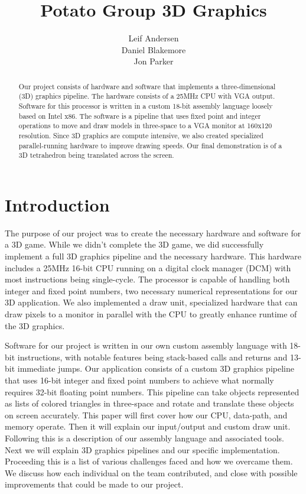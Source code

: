\documentclass[onecolumn]{IEEEtran}
\title{Potato Group 3D Graphics}
\author{Leif Andersen\\Daniel Blakemore\\Jon Parker}
\begin{document}
\maketitle

\begin{abstract}
Our project consists of hardware and software that implements a three-dimensional (3D) graphics pipeline.  The hardware consists of a 25MHz CPU with VGA output.  Software for this processor is written in a custom 18-bit assembly language loosely based on Intel x86.  The software is a pipeline that uses fixed point and integer operations to move and draw models in three-space to a VGA monitor at 160x120 resolution.  Since 3D graphics are compute intensive, we also created specialized parallel-running hardware to improve drawing speeds.  Our final demonstration is of a 3D tetrahedron being translated across the screen.
\end{abstract}

\section{Introduction}
The purpose of our project was to create the necessary hardware and software for a 3D game.  While we didn’t complete the 3D game, we did successfully implement a full 3D graphics pipeline and the necessary hardware.  This hardware includes a 25MHz 16-bit CPU running on a digital clock manager (DCM) with most instructions being single-cycle.  The processor is capable of handling both integer and fixed point numbers, two necessary numerical representations for our 3D application.  We also implemented a draw unit, specialized hardware that can draw pixels to a monitor in parallel with the CPU to greatly enhance runtime of the 3D graphics.

Software for our project is written in our own custom assembly language with 18-bit instructions, with notable features being stack-based calls and returns and 13-bit immediate jumps.  Our application consists of a custom 3D graphics pipeline that uses 16-bit integer and fixed point numbers to achieve what normally requires 32-bit floating point numbers.  This pipeline can take objects represented as lists of colored triangles in three-space and rotate and translate these objects on screen accurately.   This paper will first cover how our CPU, data-path, and memory operate.  Then it will explain our input/output and custom draw unit.  Following this is a description of our assembly language and associated tools.  Next we will explain 3D graphics pipelines and our specific implementation.  Proceeding this is a list of various challenges faced and how we overcame them.  We discuss how each individual on the team contributed, and close with possible improvements that could be made to our project.
\end{document}
